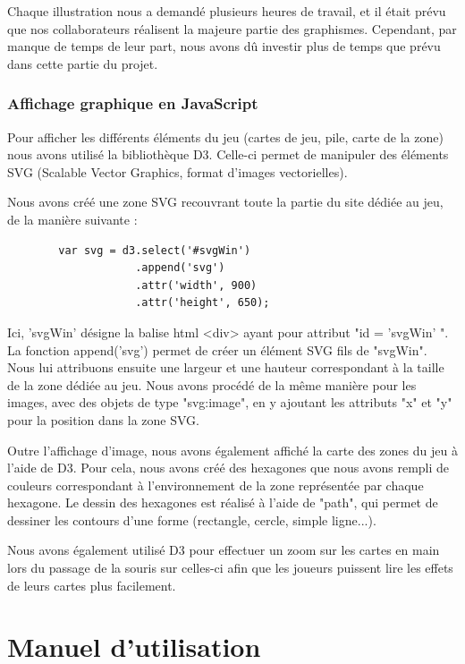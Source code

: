 \documentclass[12pt]{report}
\begin{document}
        Chaque illustration nous a demandé plusieurs heures de travail, et il était prévu que nos collaborateurs réalisent la majeure partie des graphismes. Cependant, par manque de temps de leur part, nous avons dû investir plus de temps que prévu dans cette partie du projet. 
        
        
        \subsection{Affichage graphique en JavaScript}
        
        Pour afficher les différents éléments du jeu (cartes de jeu, pile, carte de la zone) nous avons utilisé la bibliothèque D3. Celle-ci permet de manipuler des éléments SVG (Scalable Vector Graphics, format d'images vectorielles). 
        
        Nous avons créé une zone SVG recouvrant toute la partie du site dédiée au jeu, de la manière suivante :
        
        \begin{verbatim}
        var svg = d3.select('#svgWin')
                    .append('svg')
                    .attr('width', 900)
                    .attr('height', 650);
        \end{verbatim}
        
        Ici, 'svgWin' désigne la balise html <div> ayant pour attribut "id = 'svgWin' ". La fonction append('svg') permet de créer un élément SVG fils de "svgWin". Nous lui attribuons ensuite une largeur et une hauteur correspondant à la taille de la zone dédiée au jeu. Nous avons procédé de la même manière pour les images, avec des objets de type "svg:image", en y ajoutant les attributs "x" et "y" pour la position dans la zone SVG. 
        
        Outre l'affichage d'image, nous avons également affiché la carte des zones du jeu à l'aide de D3. Pour cela, nous avons créé des hexagones que nous avons rempli de couleurs correspondant à l'environnement de la zone représentée par chaque hexagone. Le dessin des hexagones est réalisé à l'aide de "path", qui permet de dessiner les contours d'une forme (rectangle, cercle, simple ligne...).
        
        Nous avons également utilisé D3 pour effectuer un zoom sur les cartes en main lors du passage de la souris sur celles-ci afin que les joueurs puissent lire les effets de leurs cartes plus facilement. 
        
    
\chapter{Manuel d'utilisation}
\end{document}
